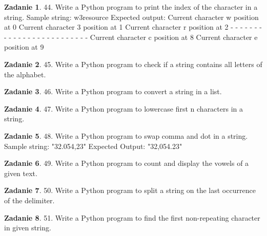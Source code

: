 \documentclass[11pt]{article}
\theoremstyle{definition}
\newtheorem{zadanie}{Zadanie}
\begin{document}
\begin{zadanie}


44. Write a Python program to print the index of the character in a string. 
Sample string: w3resource
Expected output:
Current character w position at 0
Current character 3 position at 1
Current character r position at 2
- - - - - - - - - - - - - - - - - - - - - - - - -
Current character c position at 8
Current character e position at 9

\end{zadanie}

\begin{zadanie}


45. Write a Python program to check if a string contains all letters of the alphabet. 

\end{zadanie}

\begin{zadanie}


46. Write a Python program to convert a string in a list. 

\end{zadanie}

\begin{zadanie}


47. Write a Python program to lowercase first n characters in a string. 

\end{zadanie}

\begin{zadanie}


48. Write a Python program to swap comma and dot in a string. 
Sample string: "32.054,23"
Expected Output: "32,054.23"

\end{zadanie}

\begin{zadanie}


49. Write a Python program to count and display the vowels of a given text. 

\end{zadanie}

\begin{zadanie}


50. Write a Python program to split a string on the last occurrence of the delimiter. 

\end{zadanie}

\begin{zadanie}


51. Write a Python program to find the first non-repeating character in given string. 

\end{zadanie}
\end{document}
